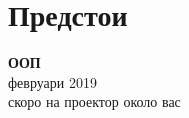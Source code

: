 \documentclass[alsotrans]{beamerswitch}
\begin{document}
\section*{Предстои}


\begin{frame}
  \begin{center}
    \Huge
    \alert{\textbf{ООП}}\\[0.5em]
    \Large
    февруари 2019\\[2em]
    \pause
    \small
    скоро на проектор около вас
  \end{center}
\end{frame}
\end{document}
